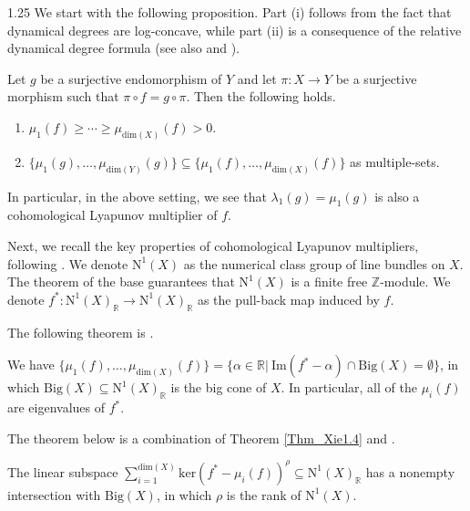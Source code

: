 \documentclass[12pt]{amsart}
\begin{document}
\begin{spacing}{1.25}
We start with the following proposition. Part (i) follows from the fact that dynamical degrees are log-concave, while part (ii) is a consequence of the relative dynamical degree formula \cite[Theorem 1.1]{DN11} (see also \cite[Theorem 4]{Dang} and \cite[Theorem 1.3]{Tru20}).

\begin{proposition}\label{Prop_Lya}
Let $g$ be a surjective endomorphism of $Y$ and let $\pi:X\rightarrow Y$ be a surjective morphism such that $\pi\circ f=g\circ\pi$. Then the following holds.
\begin{enumerate}
\item
$\mu_1(f)\geq\cdots\geq\mu_{\mathrm{dim}(X)}(f)>0$.
\item
$\{\mu_1(g),\dots,\mu_{\mathrm{dim}(Y)}(g)\}\subseteq\{\mu_1(f),\dots,\mu_{\mathrm{dim}(X)}(f)\}$ as multiple-sets.
\end{enumerate}
\end{proposition}

In particular, in the above setting, we see that $\lambda_1(g)=\mu_1(g)$ is also a cohomological Lyapunov multiplier of $f$.

Next, we recall the key properties of cohomological Lyapunov multipliers, following \cite{xie25}. We denote $\mathrm{N}^1(X)$ as the numerical class group of line bundles on $X$. The theorem of the base guarantees that $\mathrm{N}^1(X)$ is a finite free $\mathbb{Z}$-module. We denote $f^*:\text{N}^1(X)_{\mathbb{R}}\rightarrow\text{N}^1(X)_{\mathbb{R}}$ as the pull-back map induced by $f$.

The following theorem is \cite[Theorem 1.4]{xie25}.

\begin{theorem}\label{Thm_Xie1.4}
We have $\{\mu_1(f),\dots,\mu_{\mathrm{dim}(X)}(f)\}=\{\alpha\in\mathbb{R}|\ \mathrm{Im}(f^*-\alpha)\cap\mathrm{Big}(X)=\emptyset\}$, in which $\mathrm{Big}(X)\subseteq\mathrm{N}^1(X)_{\mathbb{R}}$ is the big cone of $X$. In particular, all of the $\mu_i(f)$ are eigenvalues of $f^*$.
\end{theorem}

The theorem below is a combination of Theorem \ref{Thm_Xie1.4} and \cite[Theorem 1.3]{xie25}.

\begin{theorem}\label{Thm_Xie1.3}
The linear subspace $\sum\limits_{i=1}^{\mathrm{dim}(X)}\mathrm{ker}(f^*-\mu_i(f))^{\rho}\subseteq\mathrm{N}^1(X)_{\mathbb{R}}$ has a nonempty intersection with $\mathrm{Big}(X)$, in which $\rho$ is the rank of $\mathrm{N}^1(X)$.
\end{theorem}


\end{spacing}
\end{document}
